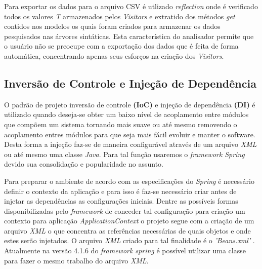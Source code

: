 Para exportar os dados para o arquivo \acs{CSV} é utlizado \textit{reflection} onde é verificado todos os valores \textit{T} armazenados pelos \textit{Visitors} e extratido dos métodos \textit{get} contidos nos modelos os quais foram criados para armazenar os dados pesquisados nas árvores sintáticas. Esta característica do analisador permite que o usuário não se preocupe com a exportação dos dados que é feita de forma automática, concentrando apenas seus esforços na criação dos \textit{Visitors}.





\subsection{Inversão de Controle e Injeção de Dependência}
O padrão de projeto inversão de controle \textbf{(IoC)} e injeção de dependência \textbf{(DI)} é utilizado quando deseja-se obter um baixo nível de acoplamento entre módulos que compõem um sistema tornando mais suave ou até mesmo removendo o acoplamento entres módulos para que seja mais fácil evoluir e manter o software. Desta forma a injeção faz-se de maneira configurável através de um arquivo \textit{XML} ou até mesmo uma classe \textit{Java}. Para tal função usaremos o {\it framework Spring} devido sua consolidação e popularidade no assunto.

Para preparar o ambiente de acordo com as especificações do {\it Spring} é necessário definir o contexto da aplicação e para isso é faz-se necessário criar antes de injetar as dependências as configurações iniciais. Dentre as possíveis formas disponibilizadas pelo {\it framework} de conceder tal configuração para criação um contexto para aplicação \textit{ApplicationContext} o projeto segue com a criação de um arquivo \textit{XML} o que concentra as referências necessárias de quais objetos e onde estes serão injetados. O arquivo \textit{XML} criado para tal finalidade é o \textit{'Beans.xml'} . Atualmente na versão 4.1.6 do {\it framework spring} é possível utilizar uma classe para fazer o mesmo trabalho do arquivo \textit{XML}. 


